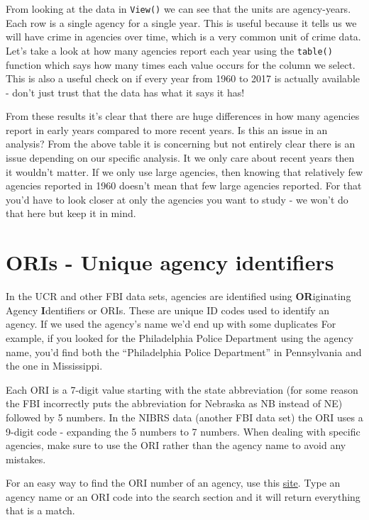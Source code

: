 \documentclass[
  12pt,
  openany]{book}
\begin{document}
From looking at the data in \texttt{View()} we can see that the units are agency-years. Each row is a single agency for a single year. This is useful because it tells us we will have crime in agencies over time, which is a very common unit of crime data. Let's take a look at how many agencies report each year using the \texttt{table()} function which says how many times each value occurs for the column we select. This is also a useful check on if every year from 1960 to 2017 is actually available - don't just trust that the data has what it says it has!

From these results it's clear that there are huge differences in how many agencies report in early years compared to more recent years. Is this an issue in an analysis? From the above table it is concerning but not entirely clear there is an issue depending on our specific analysis. It we only care about recent years then it wouldn't matter. If we only use large agencies, then knowing that relatively few agencies reported in 1960 doesn't mean that few large agencies reported. For that you'd have to look closer at only the agencies you want to study - we won't do that here but keep it in mind.

\hypertarget{oris---unique-agency-identifiers}{%
\section{ORIs - Unique agency identifiers}\label{oris---unique-agency-identifiers}}

In the UCR and other FBI data sets, agencies are identified using \textbf{OR}iginating Agency \textbf{I}dentifiers or ORIs. These are unique ID codes used to identify an agency. If we used the agency's name we'd end up with some duplicates For example, if you looked for the Philadelphia Police Department using the agency name, you'd find both the ``Philadelphia Police Department'' in Pennsylvania and the one in Mississippi.

Each ORI is a 7-digit value starting with the state abbreviation (for some reason the FBI incorrectly puts the abbreviation for Nebraska as NB instead of NE) followed by 5 numbers. In the NIBRS data (another FBI data set) the ORI uses a 9-digit code - expanding the 5 numbers to 7 numbers. When dealing with specific agencies, make sure to use the ORI rather than the agency name to avoid any mistakes.

For an easy way to find the ORI number of an agency, use this \href{http://crimedatatool.com/crosswalk.html}{site}. Type an agency name or an ORI code into the search section and it will return everything that is a match.
\end{document}
